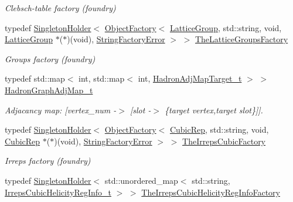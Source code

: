 \begin{DoxyCompactItemize}
\begin{DoxyCompactList}\small\item\em Clebsch-\/table factory (foundry) \end{DoxyCompactList}\item 
typedef \mbox{\hyperlink{classUtil_1_1SingletonHolder}{Singleton\+Holder}}$<$ \mbox{\hyperlink{classUtil_1_1ObjectFactory}{Object\+Factory}}$<$ \mbox{\hyperlink{structHadron_1_1LatticeGroup}{Lattice\+Group}}, std\+::string, void, \mbox{\hyperlink{structHadron_1_1LatticeGroup}{Lattice\+Group}} $\ast$($\ast$)(void), \mbox{\hyperlink{structUtil_1_1StringFactoryError}{String\+Factory\+Error}} $>$ $>$ \mbox{\hyperlink{namespaceHadron_a02f5300bae0fd0f2966756ba9c021b49}{The\+Lattice\+Groups\+Factory}}
\begin{DoxyCompactList}\small\item\em Groups factory (foundry) \end{DoxyCompactList}\item 
typedef std\+::map$<$ int, std\+::map$<$ int, \mbox{\hyperlink{structHadron_1_1HadronAdjMapTarget__t}{Hadron\+Adj\+Map\+Target\+\_\+t}} $>$ $>$ \mbox{\hyperlink{namespaceHadron_ad6387ffed6a1bf53021dce29b71d3a04}{Hadron\+Graph\+Adj\+Map\+\_\+t}}
\begin{DoxyCompactList}\small\item\em Adjacancy map\+: \mbox{[}vertex\+\_\+num -\/$>$ \mbox{[}slot -\/$>$ \{target vertex,target slot\}\mbox{]}\mbox{]}. \end{DoxyCompactList}\item 
typedef \mbox{\hyperlink{classUtil_1_1SingletonHolder}{Singleton\+Holder}}$<$ \mbox{\hyperlink{classUtil_1_1ObjectFactory}{Object\+Factory}}$<$ \mbox{\hyperlink{structHadron_1_1CubicRep}{Cubic\+Rep}}, std\+::string, void, \mbox{\hyperlink{structHadron_1_1CubicRep}{Cubic\+Rep}} $\ast$($\ast$)(void), \mbox{\hyperlink{structUtil_1_1StringFactoryError}{String\+Factory\+Error}} $>$ $>$ \mbox{\hyperlink{namespaceHadron_a9b693812688b7b56d095964989de20b2}{The\+Irreps\+Cubic\+Factory}}
\begin{DoxyCompactList}\small\item\em Irreps factory (foundry) \end{DoxyCompactList}\item 
typedef \mbox{\hyperlink{classUtil_1_1SingletonHolder}{Singleton\+Holder}}$<$ std\+::unordered\+\_\+map$<$ std\+::string, \mbox{\hyperlink{structHadron_1_1IrrepsCubicHelicityRegInfo__t}{Irreps\+Cubic\+Helicity\+Reg\+Info\+\_\+t}} $>$ $>$ \mbox{\hyperlink{namespaceHadron_acaa1813cdd4fc3754e8a24a3f0d5267a}{The\+Irreps\+Cubic\+Helicity\+Reg\+Info\+Factory}}

\end{DoxyCompactItemize}
